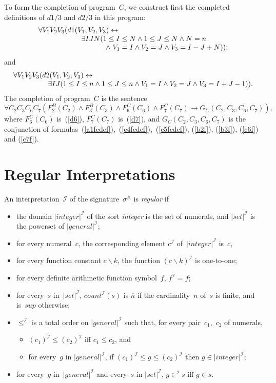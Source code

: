 \documentclass[11pt]{article}
\def\o{\overline}
\def\bs{\backslash}
\def\lrar{\leftrightarrow}
\def\beq{\begin{equation}}
\def\eeq#1{\label{#1}\end{equation}}
\def\ba{\begin{array}}
\def\ea{\end{array}}
\def\I{\mathcal{I}}
\newcommand{\co}{\ensuremath{\mathit{count}}}
\begin{document}
\begin{adjustwidth}{-1cm}{-1cm}
To form the completion of program~$C$, we construct first the completed
definitions of $d1/3$ and $d2/3$ in this program:
\beq\ba l
\forall V_1V_2V_3( d1(V_1,V_2,V_3)\lrar\\
\hskip 21mm
\exists I J  N(1\leq I\leq N \land 1\leq J\leq N \land N=n \\
\hskip 33mm
\land\; V_1=I\land V_2=J \land V_3= I-J+N));
\ea
\eeq{c4fcdef}
and
\beq
\ba l\forall V_1V_2V_3(d2(V_1,V_2,V_3)\lrar \\
\hskip 17mm
\exists I J  (1\leq I\leq n \land 1\leq J\leq n 
\land V_1=I \land V_2=J \land V_3= I+J-1)).
\ea
\eeq{c5fcdef}
The completion of program~$C$ is the sentence
\beq
\forall C_2 C_3 C_6 C_7(F^B_2(C_2)\land F^B_3(C_3)\land F^C_6(C_6)\land F^C_7(C_7)
\to  G_C(C_2, C_3, C_6, C_7)),
\eeq{compC}
where $F^C_6(C_6)$ is~(\ref{d6}),
$F^C_7(C_7)$ is~(\ref{d7}),
 and $G_C(C_2, C_3, C_6, C_7)$ is the conjunction of
formulas~(\ref{a1fcdef}),~(\ref{c4fcdef}),~(\ref{c5fcdef}),  (\ref{b2f}), (\ref{b3f}), (\ref{c6f}) and (\ref{c7f}).


\section{Regular Interpretations}\label{sec:regint}
An interpretation~$\I$ of the signature~$\sigma^\#$ is \emph{regular} if
\begin{itemize}
\item the domain $|\mathit{integer}|^\I$ of the sort \emph{integer} is the
  set of numerals, and $|\mathit{set}|^\I$ is the powerset of
  $|\mathit{general}|^\I$;
\item for every numeral~$c$, the corresponding element $c^\I$
  of~$|\mathit{integer}|^\I$ is~$c$,
\item for every function constant $c\bs k$, the function $(c\bs k)^\I$ is
  one-to-one;
\item for every definite arithmetic function symbol~$f$, $f^\I=f$;
\item for every~$s$ in~$|\mathit{set}|^\I$, $\co^\I(s)$ is $\o n$ if the
  cardinality~$n$ of~$s$ is finite, and is~$\mathit{sup}$  otherwise;
\item $\leq^\I$ is a total order on $|\mathit{general}|^\I$ such that, for
  every pair~$c_1$,~$c_2$ of numerals,
  \begin{itemize}
  \item
    $(c_1)^\I\leq(c_2)^\I$ iff $c_1\leq c_2$, and
  \item
    for every~$g$ in $|\mathit{general}|^\I$, if $(c_1)^\I\leq g\leq(c_2)^\I$
    then $g\in|\mathit{integer}|^\I$;
  \end{itemize}
\item for every~$g$ in~$|\mathit{general}|^\I$ and every~$s$ in
  $|\mathit{set}|^\I$, $g\in^\I s$ iff $g\in s$.
\end{itemize}


\end{adjustwidth}
\end{document}
